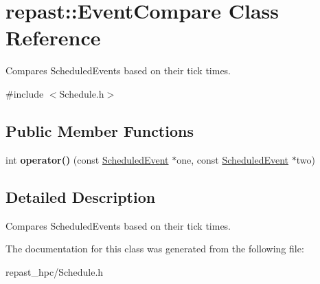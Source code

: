 \hypertarget{classrepast_1_1_event_compare}{\section{repast\-:\-:Event\-Compare Class Reference}
\label{classrepast_1_1_event_compare}
}


Compares Scheduled\-Events based on their tick times.  




{\ttfamily \#include $<$Schedule.\-h$>$}

\subsection*{Public Member Functions}
\begin{DoxyCompactItemize}
\item 
\hypertarget{classrepast_1_1_event_compare_ad7f3fe5b37b2c795f48efc46772ecd4a}{int {\bfseries operator()} (const \hyperlink{classrepast_1_1_scheduled_event}{Scheduled\-Event} $\ast$one, const \hyperlink{classrepast_1_1_scheduled_event}{Scheduled\-Event} $\ast$two)}\label{classrepast_1_1_event_compare_ad7f3fe5b37b2c795f48efc46772ecd4a}

\end{DoxyCompactItemize}


\subsection{Detailed Description}
Compares Scheduled\-Events based on their tick times. 

The documentation for this class was generated from the following file\-:\begin{DoxyCompactItemize}
\item 
repast\-\_\-hpc/Schedule.\-h\end{DoxyCompactItemize}
